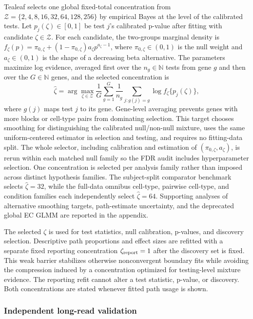 \documentclass[11pt]{article}
\begin{document}
Tealeaf selects one global fixed-total concentration from \(\mathcal Z=\{2,4,8,16,32,64,128,256\}\) by empirical Bayes at the level of the calibrated tests. Let \(p_j(\zeta)\in[0,1]\) be test \(j\)'s calibrated p-value after fitting with candidate \(\zeta\in\mathcal Z\). For each candidate, the two-groups marginal density is \(f_\zeta(p)=\pi_{0,\zeta}+(1-\pi_{0,\zeta})a_\zeta p^{a_\zeta-1}\), where \(\pi_{0,\zeta}\in(0,1)\) is the null weight and \(a_\zeta\in(0,1)\) is the shape of a decreasing beta alternative. The parameters maximize log evidence, averaged first over the \(n_g\in\mathbb N\) tests from gene \(g\) and then over the \(G\in\mathbb N\) genes, and the selected concentration is \[\widehat\zeta=\arg\max_{\zeta\in\mathcal Z}\frac1G\sum_{g=1}^G\frac1{n_g}\sum_{j:g(j)=g}\log f_\zeta\{p_j(\zeta)\},\] where \(g(j)\) maps test \(j\) to its gene. Gene-level averaging prevents genes with more blocks or cell-type pairs from dominating selection. This target chooses smoothing for distinguishing the calibrated null/non-null mixture, uses the same uniform-centered estimator in selection and testing, and requires no fitting-data split. The whole selector, including calibration and estimation of \((\pi_{0,\zeta},a_\zeta)\), is rerun within each matched null family so the FDR audit includes hyperparameter selection. One concentration is selected per analysis family rather than imposed across distinct hypothesis families. The subject-split comparator benchmark selects \(\widehat\zeta=32\), while the full-data omnibus cell-type, pairwise cell-type, and condition families each independently select \(\widehat\zeta=64\). Supporting analyses of alternative smoothing targets, path-estimate uncertainty, and the deprecated global EC GLMM are reported in the appendix.

The selected \(\widehat\zeta\) is used for test statistics, null calibration, p-values, and discovery selection. Descriptive path proportions and effect sizes are refitted with a separate fixed reporting concentration \(\zeta_{\rm report}=1\) after the discovery set is fixed. This weak barrier stabilizes otherwise nonconvergent boundary fits while avoiding the compression induced by a concentration optimized for testing-level mixture evidence. The reporting refit cannot alter a test statistic, p-value, or discovery. Both concentrations are stated whenever fitted path usage is shown.

\subsubsection*{Independent long-read validation}
\end{document}
